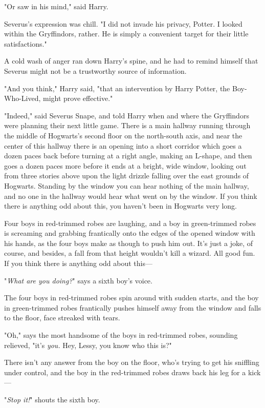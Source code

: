 "Or saw in his mind," said Harry.

Severus's expression was chill. "I did not invade his privacy, Potter. I looked
within the Gryffindors, rather. He is simply a convenient target for their
little satisfactions."

A cold wash of anger ran down Harry's spine, and he had to remind himself that
Severus might not be a trustworthy source of information.

"And you think," Harry said, "that an intervention by Harry Potter, the
Boy-Who-Lived, might prove effective."

"Indeed," said Severus Snape, and told Harry when and where the Gryffindors
were planning their next little game.
\later
There is a main hallway running through the middle of Hogwarts's second floor
on the north-south axis, and near the center of this hallway there is an
opening into a short corridor which goes a dozen paces back before turning at a
right angle, making an L-shape, and then goes a dozen paces more before it ends
at a bright, wide window, looking out from three stories above upon the light
drizzle falling over the east grounds of Hogwarts. Standing by the window you
can hear nothing of the main hallway, and no one in the hallway would hear what
went on by the window. If you think there is anything odd about this, you
haven't been in Hogwarts very long.

Four boys in red-trimmed robes are laughing, and a boy in green-trimmed robes
is screaming and grabbing frantically onto the edges of the opened window with
his hands, as the four boys make as though to push him out. It's just a joke,
of course, and besides, a fall from that height wouldn't kill a wizard. All
good fun. If you think there is anything odd about this---

"\emph{What are you doing?}" says a sixth boy's voice.

The four boys in red-trimmed robes spin around with sudden starts, and the boy
in green-trimmed robes frantically pushes himself away from the window and
falls to the floor, face streaked with tears.

"Oh," says the most handsome of the boys in red-trimmed robes, sounding
relieved, "it's \emph{you.} Hey, Lessy, you know who this is?"

There isn't any answer from the boy on the floor, who's trying to get his
sniffling under control, and the boy in the red-trimmed robes draws back his
leg for a kick---

"\emph{Stop it!}" shouts the sixth boy.

